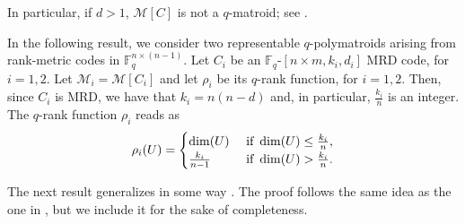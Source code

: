 \documentclass[a4paper,11pt,reqno]{amsart}
\theoremstyle{definition}
\newcommand{\mM}{\mathcal{M}}
\newcommand{\F}{\mathbb F}
\begin{document}
{In particular, if $d>1$, $\mM[C]$ is not a $q$-matroid; see \cite[Cor. 3.11]{gluesing2022q}.

In the following result, we consider two representable $q$-polymatroids arising from rank-metric codes in $\F_q^{n\times (n-1)}$. Let $C_i$ be an $\F_q$-$[n\times m,k_i,d_i]$ MRD code, for $i=1,2$. Let $\mM_i=\mM[C_i]$ and let $\rho_i$ be its $q$-rank function, for $i=1,2$. Then, since $C_i$ is MRD, we have that $k_i=n(n-d)$ and, in particular, $\frac{k_i}{n}$ is an integer. The $q$-rank function $\rho_i$ reads as
$$ \rho_i(U)=\begin{cases}
    \dim(U) & \textnormal{ if } \dim(U)\leq \frac{k_i}{n},\\
    \frac{k_i}{n-1} & \textnormal{ if } \dim(U)> \frac{k_i}{n}.
\end{cases}$$

The next result generalizes in some way . The proof follows the same idea as the one in , but we include it for the sake of completeness.

}
\end{document}
